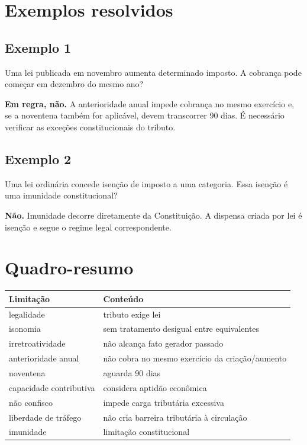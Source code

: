 \documentclass[11pt,a4paper]{article}
\begin{document}
\section*{Exemplos resolvidos}

\subsection*{Exemplo 1}

Uma lei publicada em novembro aumenta determinado imposto. A cobrança pode começar em dezembro do mesmo ano?

\textbf{Em regra, não.} A anterioridade anual impede cobrança no mesmo exercício e, se a noventena também for aplicável, devem transcorrer 90 dias. É necessário verificar as exceções constitucionais do tributo.

\subsection*{Exemplo 2}

Uma lei ordinária concede isenção de imposto a uma categoria. Essa isenção é uma imunidade constitucional?

\textbf{Não.} Imunidade decorre diretamente da Constituição. A dispensa criada por lei é isenção e segue o regime legal correspondente.

\section*{Quadro-resumo}

\begin{tabularx}{\linewidth}{lX}
\toprule
 \textbf{Limitação} & \textbf{Conteúdo} \\
\midrule
 legalidade & tributo exige lei \\
 isonomia & sem tratamento desigual entre equivalentes \\
 irretroatividade & não alcança fato gerador passado \\
 anterioridade anual & não cobra no mesmo exercício da criação/aumento \\
 noventena & aguarda 90 dias \\
 capacidade contributiva & considera aptidão econômica \\
 não confisco & impede carga tributária excessiva \\
 liberdade de tráfego & não cria barreira tributária à circulação \\
 imunidade & limitação constitucional \\
\bottomrule
\end{tabularx}
\end{document}
